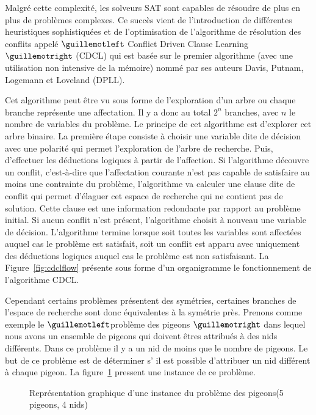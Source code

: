 Malgré cette complexité, les solveurs SAT sont capables de résoudre de plus en plus de problèmes complexes.
Ce succès vient de l'introduction de différentes heuristiques sophistiquées et de l'optimisation de l'algorithme de
résolution des conflits appelé $\guillemotleft$ Conflict Driven Clause Learning$\guillemotright$ (CDCL) qui est basée sur le premier
algorithme (avec une utilisation non intensive de la  mémoire) nommé par ses auteurs Davis, Putnam, Logemann
et Loveland (DPLL)\cite{dpll_62}.


Cet algorithme peut être vu sous forme de l'exploration d'un arbre ou chaque branche représente 
une affectation. Il y a donc au total $2^n$ branches, avec $n$ le nombre de variables du problème.
Le principe de cet algorithme est d'explorer cet arbre binaire. 
La première étape consiste à choisir une variable dite de décision avec une polarité qui permet l'exploration
de l'arbre de recherche. Puis, d'effectuer les déductions logiques à partir de l'affection. 
Si l'algorithme découvre un conflit, c'est-à-dire que l'affectation courante n'est pas capable de satisfaire au moins une contrainte du problème, l'algorithme va calculer une clause dite de conflit qui permet d'élaguer 
cet espace de recherche qui ne contient pas de solution. Cette clause est une information redondante par
rapport au problème initial. Si aucun conflit n'est présent, l'algorithme choisit à nouveau une variable de décision. L'algorithme termine lorsque soit toutes les variables sont affectées auquel cas le problème 
est satisfait, soit un conflit est apparu avec uniquement des déductions logiques auquel cas le
problème est non satisfaisant.
La Figure~\ref{fig:cdclflow} présente sous forme d'un organigramme le fonctionnement de l'algorithme CDCL.




Cependant certains problèmes présentent des symétries, certaines branches de l'espace de recherche 
sont donc équivalentes à la symétrie près. Prenons comme exemple le $\guillemotleft$problème des pigeons $\guillemotright$ dans lequel nous avons un ensemble de pigeons qui doivent êtres attribués à des nids différents. Dans ce problème il y a un nid de moins que le nombre de pigeons.
Le but de ce problème est de déterminer s’ il est possible d'attribuer un nid différent à chaque pigeon.
 La figure~\ref{fig:holefr} pressent une instance de ce problème.
 
 
 \begin{figure}[!htbp]
  \centering
  \caption{Représentation graphique d'une instance du problème des pigeons(5 pigeons, 4 nids)}
  \label{fig:holefr}
 \end{figure}
 
